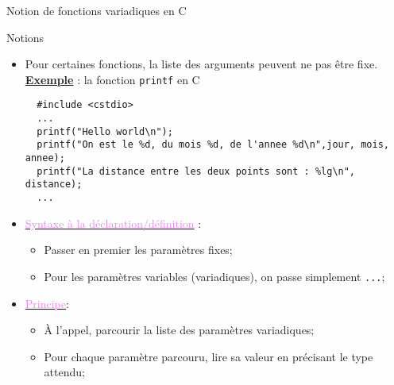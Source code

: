\documentclass[compress,10pt,aspectratio=169]{beamer}
\begin{document}
\begin{frame}[fragile]{Notion de fonctions variadiques en C}
  \scriptsize\vspace*{-3mm}
  
  \begin{block}{\small Notions}
  \begin{itemize}
  \item Pour certaines fonctions, la liste des arguments peuvent ne pas être fixe.\\
  \underline{\textcolor{NavyBlue}{\bf Exemple}} : la fonction \texttt{printf} en C
  \begin{verbatim}
  #include <cstdio>
  ... 
  printf("Hello world\n");
  printf("On est le %d, du mois %d, de l'annee %d\n",jour, mois, annee);
  printf("La distance entre les deux points sont : %lg\n", distance);
  ...
  \end{verbatim}
  \item \underline{\textcolor{violet}{Syntaxe à la déclaration/définition}} : 
  \begin{itemize}
  \scriptsize
  \item Passer en premier les paramètres fixes;
  \item Pour les paramètres variables (variadiques), on passe simplement \texttt{...};
  \end{itemize}
  \item \underline{\textcolor{violet}{Principe}}:
  \begin{itemize}
  \scriptsize 
  \item À l'appel, parcourir la liste des paramètres variadiques;
  \item Pour chaque paramètre parcouru, lire sa valeur en précisant le type attendu;
  \end{itemize}
  \end{itemize}
  \end{block}
  \end{frame}
  
\end{document}
